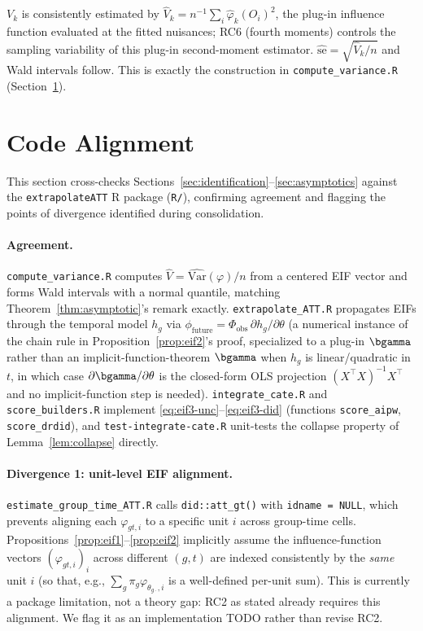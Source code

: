 \documentclass{article}
\begin{document}
\begin{remark}
$V_k$ is consistently estimated by $\widehat V_k = n^{-1}\sum_i \widehat\varphi_k(O_i)^2$, the plug-in influence function evaluated at the fitted nuisances; RC6 (fourth moments) controls the sampling variability of this plug-in second-moment estimator. $\widehat{\mathrm{se}} = \sqrt{\widehat V_k/n}$ and Wald intervals follow. This is exactly the construction in \texttt{compute\_variance.R} (Section~\ref{sec:codealign}).
\end{remark}

\section{Code Alignment}
\label{sec:codealign}

This section cross-checks Sections~\ref{sec:identification}--\ref{sec:asymptotics} against the \texttt{extrapolateATT} R package (\texttt{R/}), confirming agreement and flagging the points of divergence identified during consolidation.

\paragraph{Agreement.} \texttt{compute\_variance.R} computes $\widehat V = \widehat{\mathrm{Var}}(\varphi)/n$ from a centered EIF vector and forms Wald intervals with a normal quantile, matching Theorem~\ref{thm:asymptotic}'s remark exactly. \texttt{extrapolate\_ATT.R} propagates EIFs through the temporal model $h_g$ via $\phi_{\text{future}} = \Phi_{\text{obs}}\,\partial h_g/\partial\theta$ (a numerical instance of the chain rule in Proposition~\ref{prop:eif2}'s proof, specialized to a plug-in $\bgamma$ rather than an implicit-function-theorem $\bgamma$ when $h_g$ is linear/quadratic in $t$, in which case $\partial\bgamma/\partial\theta$ is the closed-form OLS projection $(X^\top X)^{-1}X^\top$ and no implicit-function step is needed). \texttt{integrate\_cate.R} and \texttt{score\_builders.R} implement \eqref{eq:eif3-unc}--\eqref{eq:eif3-did} (functions \texttt{score\_aipw}, \texttt{score\_drdid}), and \texttt{test-integrate-cate.R} unit-tests the collapse property of Lemma~\ref{lem:collapse} directly.

\paragraph{Divergence 1: unit-level EIF alignment.} \texttt{estimate\_group\_time\_ATT.R} calls \texttt{did::att\_gt()} with \texttt{idname = NULL}, which prevents aligning each $\varphi_{gt,i}$ to a specific unit $i$ across group-time cells. Propositions~\ref{prop:eif1}--\ref{prop:eif2} implicitly assume the influence-function vectors $(\varphi_{gt,i})_i$ across different $(g,t)$ are indexed consistently by the \emph{same} unit $i$ (so that, e.g., $\sum_g \pi_g\varphi_{\theta_{g\cdot},i}$ is a well-defined per-unit sum). This is currently a package limitation, not a theory gap: RC2 as stated already requires this alignment. We flag it as an implementation TODO rather than revise RC2.
\end{document}
